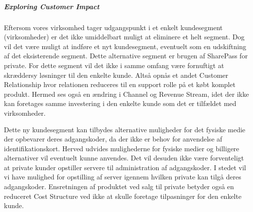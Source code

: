 \subparagraph{Exploring Customer Impact}
Eftersom vores virksomhed tager udgangspunkt i et enkelt kundesegment (virksomheder) er det ikke umiddelbart muligt at eliminere et helt segment.
Dog vil det være muligt at indføre et nyt kundesegment, eventuelt som en udskiftning af det eksisterende segment.
Dette alternative segment er brugen af SharePass for private.
For dette segment vil det ikke i samme omfang være fornuftigt at skræddersy løsninger til den enkelte kunde.
Altså opnås et andet Customer Relationship hvor relationen reduceres til en support rolle på et købt komplet produkt.
Hermed ses også en ændring i Channel og Revenue Stream, idet der ikke kan foretages samme investering i den enkelte kunde som det er tilfældet med virksomheder.

Dette ny kundesegment kan tilbydes alternative muligheder for det fysiske medie der opbevarer deres adgangskoder, da der ikke er behov for anvendelse af identifikationskort.
Herved udvides mulighederne for fysiske medier og billigere alternativer vil eventuelt kunne anvendes.
Det vil desuden ikke være forventeligt at private kunder opstiller servere til administration af adgangskoder.
I stedet vil vi have mulighed for opstilling af server igennem hvilken private kan tilgå deres adgangskoder.
Ensretningen af produktet ved salg til private betyder også en reduceret Cost Structure ved ikke at skulle foretage tilpasninger for den enkelte kunde.


